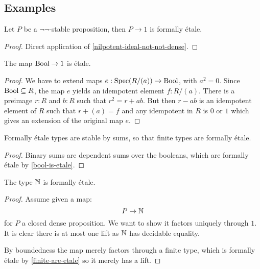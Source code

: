 \subsection{Examples}

\begin{proposition}%
  Let $P$ be a $\neg\neg$-stable proposition,
  then $P\to 1$ is formally étale.
\end{proposition}

\begin{proof}
  Direct application of \cref{nilpotent-ideal-not-not-dense}.
\end{proof}

\begin{proposition}\label{bool-is-etale}
  The map $\mathrm{Bool}\to 1$ is étale.
\end{proposition}

\begin{proof}
  We have to extend maps $e:\operatorname{Spec} (R/(a))\to \mathrm{Bool}$, with $a^2=0$.
  Since $\mathrm{Bool}\subseteq R$, the map $e$ yields an idempotent element $f:R/(a)$.
  There is a preimage $r:R$ and $b:R$ such that $r^2=r+ab$.
  But then $r-ab$ is an idempotent element of $R$ such that $r+(a)=f$
  and any idempotent in $R$ is $0$ or $1$ which gives an extension of the original map $e$.
\end{proof}

\begin{proposition}\label{finite-are-etale}
Formally étale types are stable by sums, so that finite types are formally étale.
\end{proposition}

\begin{proof}
Binary sums are dependent sums over the booleans, which are formally étale by \cref{bool-is-etale}.
\end{proof}

\begin{proposition}
The type $\mathbb{N}$ is formally étale.
\end{proposition}

\begin{proof}
Assume given a map:
\[P\to \mathbb{N}\]
for $P$ a closed dense proposition. We want to show it factors uniquely through $1$. It is clear there is at most one lift as $\mathbb{N}$ has decidable equality.

By boundedness the map merely factors through a finite type, which is formally étale by \cref{finite-are-etale} so it merely has a lift.
\end{proof}


